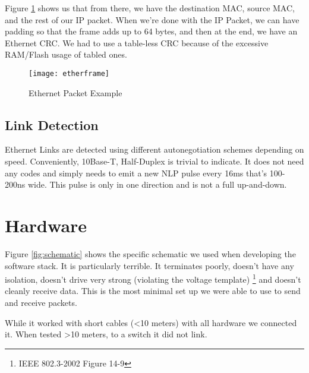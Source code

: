 \documentclass[13pt]{ltxdoc}
\begin{document}
Figure \ref{etherfarme} shows us that from there, we have the destination MAC, source MAC, and the rest of our IP packet.
When we're done with the IP Packet, we can have padding so that the frame adds up to 64 bytes, and then at the end, we have an Ethernet CRC.
We had to use a table-less CRC because of the excessive RAM/Flash usage of tabled ones.

\begin{figure}
    \centering
    \texttt{[image: etherframe]}
    \caption{Ethernet Packet Example}
    \label{etherfarme}
\end{figure}


\subsection{Link Detection}
Ethernet Links are detected using different autonegotiation schemes depending on speed.  Conveniently,
10Base-T, Half-Duplex is trivial to indicate.  It does not need any codes and simply needs to emit
a new NLP pulse every 16ms that's 100-200ns wide.  This pulse is only in one direction and is not a full
up-and-down.

\section{Hardware}
Figure \ref{fig:schematic} shows the specific schematic we used when developing the software stack.
It is particularly terrible.  It terminates poorly, doesn't have any isolation, doesn't drive very strong (violating the
voltage template) \footnote{IEEE 802.3-2002 Figure 14-9}
and doesn't cleanly receive data.  This is the most minimal set up we were able to use to send and receive packets.

While it worked with short cables (\textless 10 meters) with all hardware we connected it.  When tested \textgreater 10 meters,
to a switch it did not link.
\end{document}
